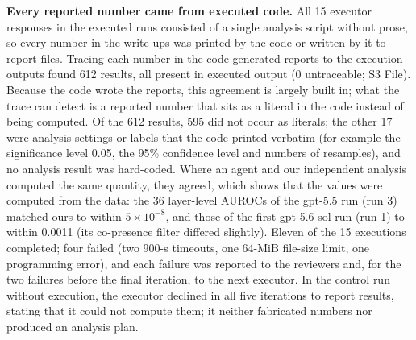 \documentclass[10pt,letterpaper]{article}
\begin{document}
\textbf{Every reported number came from executed code.} All 15 executor responses in the executed runs consisted of a single analysis script without prose, so every number in the write-ups was printed by the code or written by it to report files. Tracing each number in the code-generated reports to the execution outputs found 612 results, all present in executed output (0 untraceable; S3 File). Because the code wrote the reports, this agreement is largely built in; what the trace can detect is a reported number that sits as a literal in the code instead of being computed. Of the 612 results, 595 did not occur as literals; the other 17 were analysis settings or labels that the code printed verbatim (for example the significance level 0.05, the 95\% confidence level and numbers of resamples), and no analysis result was hard-coded. Where an agent and our independent analysis computed the same quantity, they agreed, which shows that the values were computed from the data: the 36 layer-level AUROCs of the gpt-5.5 run (run 3) matched ours to within $5\times10^{-8}$, and those of the first gpt-5.6-sol run (run 1) to within 0.0011 (its co-presence filter differed slightly). Eleven of the 15 executions completed; four failed (two 900-s timeouts, one 64-MiB file-size limit, one programming error), and each failure was reported to the reviewers and, for the two failures before the final iteration, to the next executor. In the control run without execution, the executor declined in all five iterations to report results, stating that it could not compute them; it neither fabricated numbers nor produced an analysis plan.
\end{document}

